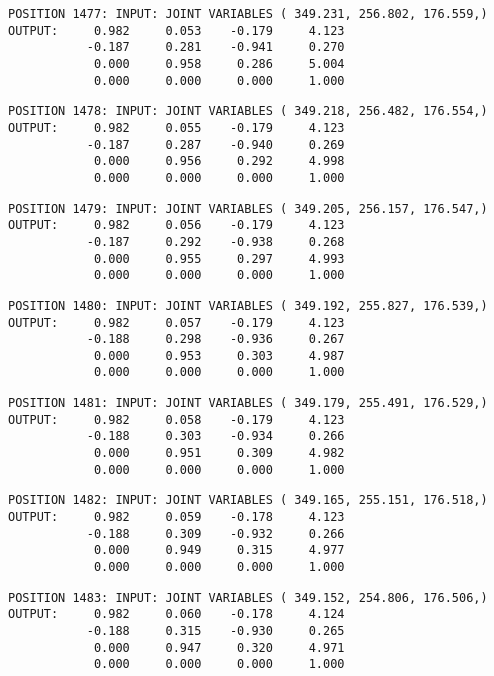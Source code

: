 \begin{verbatim}
POSITION 1477: INPUT: JOINT VARIABLES ( 349.231, 256.802, 176.559,)
OUTPUT:     0.982     0.053    -0.179     4.123
           -0.187     0.281    -0.941     0.270
            0.000     0.958     0.286     5.004
            0.000     0.000     0.000     1.000
\end{verbatim} \pagebreak[1]\begin{verbatim}
POSITION 1478: INPUT: JOINT VARIABLES ( 349.218, 256.482, 176.554,)
OUTPUT:     0.982     0.055    -0.179     4.123
           -0.187     0.287    -0.940     0.269
            0.000     0.956     0.292     4.998
            0.000     0.000     0.000     1.000
\end{verbatim} \pagebreak[1]\begin{verbatim}
POSITION 1479: INPUT: JOINT VARIABLES ( 349.205, 256.157, 176.547,)
OUTPUT:     0.982     0.056    -0.179     4.123
           -0.187     0.292    -0.938     0.268
            0.000     0.955     0.297     4.993
            0.000     0.000     0.000     1.000
\end{verbatim} \pagebreak[1]\begin{verbatim}
POSITION 1480: INPUT: JOINT VARIABLES ( 349.192, 255.827, 176.539,)
OUTPUT:     0.982     0.057    -0.179     4.123
           -0.188     0.298    -0.936     0.267
            0.000     0.953     0.303     4.987
            0.000     0.000     0.000     1.000
\end{verbatim} \pagebreak[1]\begin{verbatim}
POSITION 1481: INPUT: JOINT VARIABLES ( 349.179, 255.491, 176.529,)
OUTPUT:     0.982     0.058    -0.179     4.123
           -0.188     0.303    -0.934     0.266
            0.000     0.951     0.309     4.982
            0.000     0.000     0.000     1.000
\end{verbatim} \pagebreak[1]\begin{verbatim}
POSITION 1482: INPUT: JOINT VARIABLES ( 349.165, 255.151, 176.518,)
OUTPUT:     0.982     0.059    -0.178     4.123
           -0.188     0.309    -0.932     0.266
            0.000     0.949     0.315     4.977
            0.000     0.000     0.000     1.000
\end{verbatim} \pagebreak[1]\begin{verbatim}
POSITION 1483: INPUT: JOINT VARIABLES ( 349.152, 254.806, 176.506,)
OUTPUT:     0.982     0.060    -0.178     4.124
           -0.188     0.315    -0.930     0.265
            0.000     0.947     0.320     4.971
            0.000     0.000     0.000     1.000
\end{verbatim} \pagebreak[1]\begin{verbatim}

\end{verbatim}
